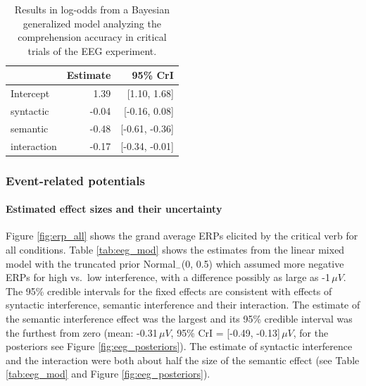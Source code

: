 \documentclass[a4paper, man, floatsintext]{apa7}
\begin{document}
\begin{table}[]
    \caption{Results in log-odds from a Bayesian generalized model analyzing the comprehension accuracy in critical trials of the EEG experiment.}
    \label{tab:eeg_acc_mod}
    \centering
    \begin{tabular}{lrr}
    \toprule
    & Estimate &  95\% CrI  \\
    \midrule
Intercept& 1.39 &   [1.10, 1.68]\\
syntactic& -0.04 &  [-0.16, 0.08]\\
semantic&  -0.48 & [-0.61, -0.36]\\
interaction& -0.17&  [-0.34, -0.01]\\
    \bottomrule
    \end{tabular}
\end{table}

\subsubsection{Event-related potentials}

\paragraph{Estimated effect sizes and their uncertainty}

Figure \ref{fig:erp_all} shows the 
grand average ERPs elicited by the critical verb for all conditions. Table \ref{tab:eeg_mod} shows the estimates from the linear mixed model with the truncated prior Normal$_-$(0, 0.5) which assumed more negative ERPs for high vs.\ low interference, with a difference possibly as large as -1\,$\mu V$. The 95\% credible intervals for the fixed effects are consistent with effects of syntactic interference, semantic interference and their interaction. The estimate of the semantic interference effect was the largest and its 95\% credible interval was the furthest from zero (mean: -0.31\,$\mu V$, 95\% CrI = [-0.49, -0.13]\,$\mu V$, for the posteriors see Figure \ref{fig:eeg_posteriors}). The estimate of syntactic interference and the interaction were both about half the size of the semantic effect (see Table \ref{tab:eeg_mod} and Figure \ref{fig:eeg_posteriors}).
\end{document}

